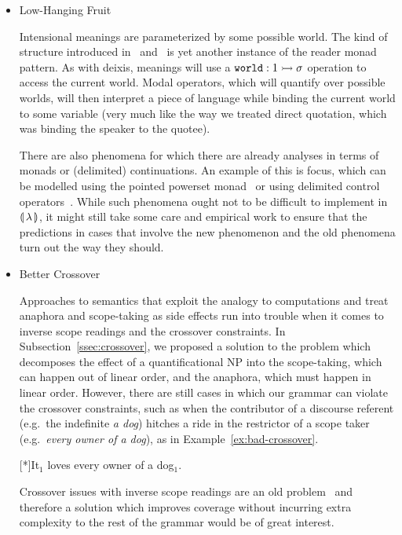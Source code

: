 \begin{itemize}
\item Low-Hanging Fruit

  Intensional meanings are parameterized by some possible world. The kind
  of structure introduced in~\cite{ben2007semantics} and~\cite{de2013note}
  is yet another instance of the reader monad pattern. As with deixis,
  meanings will use a $\mathtt{world} : 1 \rightarrowtail \sigma$ operation to access the
  current world. Modal operators, which will quantify over possible worlds,
  will then interpret a piece of language while binding the current world
  to some variable (very much like the way we treated direct quotation,
  which was binding the speaker to the quotee).

  There are also phenomena for which there are already analyses in terms of
  monads or (delimited) continuations. An example of this is focus, which
  can be modelled using the pointed powerset monad~\cite{shan2002monads} or
  using delimited control operators~\cite{barker2006continuations}. While
  such phenomena ought not to be difficult to implement in ${\llparenthesis \, \lambda \, \rrparenthesis}$, it
  might still take some care and empirical work to ensure that the
  predictions in cases that involve the new phenomenon and the old
  phenomena turn out the way they should.
  
  
\item Better Crossover

  Approaches to semantics that exploit the analogy to computations and
  treat anaphora and scope-taking as side effects run into trouble when it
  comes to inverse scope readings and the crossover constraints. In
  Subsection~\ref{ssec:crossover}, we proposed a solution to the problem
  which decomposes the effect of a quantificational NP into the
  scope-taking, which can happen out of linear order, and the anaphora,
  which must happen in linear order. However, there are still cases in
  which our grammar can violate the crossover constraints, such as when the
  contributor of a discourse referent (e.g.\ the indefinite \emph{a dog})
  hitches a ride in the restrictor of a scope taker (e.g.\ \emph{every
    owner of a dog}), as in Example~\ref{ex:bad-crossover}.

  \begin{exe}
  [*]{It$_1$ loves every owner of a dog$_1$.}
  \end{exe}

  Crossover issues with inverse scope readings are an old
  problem~\cite{shan2006explaining} and therefore a solution which improves
  coverage without incurring extra complexity to the rest of the grammar
  would be of great interest.


\end{itemize}
